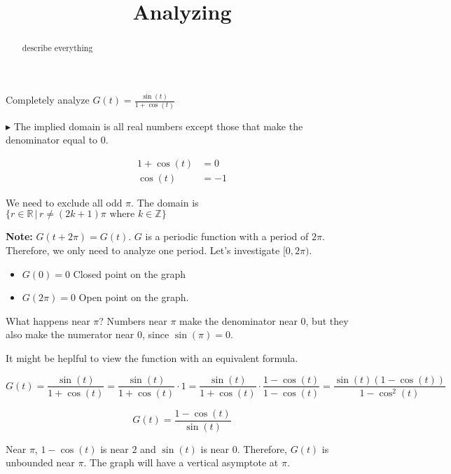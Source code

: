 \documentclass{ximera}
\title{Analyzing}
\begin{document}
\begin{abstract}
describe everything
\end{abstract}
\maketitle







Completely analyze $G(t) = \frac{\sin(t)}{1 + \cos(t)}$

$\blacktriangleright$  The implied domain is all real numbers except those that make the denominator equal to $0$.



\begin{align*}
1  + \cos(t) & = 0 \\
\cos(t) & = -1
\end{align*}


We need to exclude all odd $\pi$.  The domain is $\{  r \in \mathbb{R} \, | \, r \ne (2k+1)\pi \text{ where } k \in \mathbb{Z}   \}$



\textbf{Note:} $G(t+2\pi) = G(t)$.  $G$ is a periodic function with a period of $2\pi$.  Therefore, we only need to analyze one period.  Let's investigate $[0, 2\pi)$.

\begin{itemize}
\item $G(0) = 0$   Closed point on the graph
\item $G(2\pi) = 0$  Open point on the graph.
\end{itemize}




What happens near $\pi$?  Numbers near $\pi$ make the denominator near $0$, but they also make the numerator near $0$, since $\sin(\pi)=0$.

It might be heplful to view the function with an equivalent formula.


\[   G(t) = \frac{\sin(t)}{1 + \cos(t)}  = \frac{\sin(t)}{1 + \cos(t)}  \cdot 1 = \frac{\sin(t)}{1 + \cos(t)}  \cdot \frac{1-\cos(t)}{1-\cos(t)} = \frac{\sin(t) (1-\cos(t))}{1-\cos^2(t)}    \]



\[    G(t) = \frac{1-\cos(t)}{\sin(t)}  \]


Near $\pi$, $1-\cos(t)$ is near $2$ and $\sin(t)$ is near $0$.  Therefore, $G(t)$ is unbounded near $\pi$.  The graph will have a vertical asymptote at $\pi$.
\end{document}
